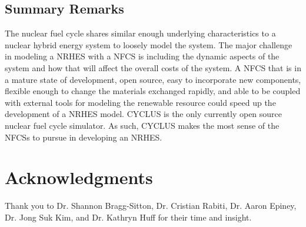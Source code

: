 \documentclass{article}                                                                           %
\begin{document}
\begin{linenumbers}
\section{Summary Remarks}
The nuclear fuel cycle shares similar enough underlying characteristics to a nuclear hybrid energy system to loosely model the system. The major challenge in modeling a NRHES with a NFCS is including the dynamic aspects of the system and how that will affect the overall costs of the system. A NFCS that is in a mature state of development, open source, easy to incorporate new components, flexible enough to change the materials exchanged rapidly, and able to be coupled with external tools for modeling the renewable resource could speed up the development of a NRHES model. CYCLUS is the only currently open source nuclear fuel cycle simulator.  As such, CYCLUS makes the most sense of the NFCSs to pursue in developing an NRHES.
\end{linenumbers}


\pagebreak
\section*{Acknowledgments}

Thank you to Dr. Shannon Bragg-Sitton, Dr. Cristian Rabiti, Dr. Aaron Epiney, Dr. Jong Suk Kim, and Dr. Kathryn Huff for their time and insight.  

\pagebreak


\end{document}
